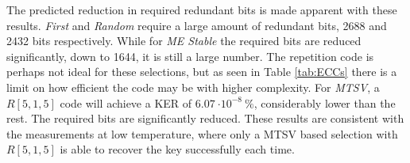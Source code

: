 The predicted reduction in required redundant bits is made apparent with these results. \textit{First} and \textit{Random} require a large amount of redundant bits, 2688 and 2432 bits respectively. While for \textit{ME Stable} the required bits are reduced significantly, down to 1644, it is still a large number. The repetition code is perhaps not ideal for these selections, but as seen in Table \ref{tab:ECCs} there is a limit on how efficient the code may be with higher complexity. For \textit{MTSV}, a $R[5,1,5]$ code will achieve a KER of $\SI{6.07}{\cdot 10^{-8}\ \%}$, considerably lower than the rest. The required bits are significantly reduced. These results are consistent with the measurements at low temperature, where only a MTSV based selection with $R[5,1,5]$ is able to recover the key successfully each time. 
 
 


